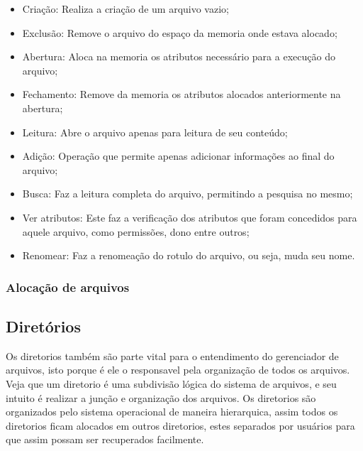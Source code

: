 \documentclass{article}
\begin{document}
\begin{itemize}

\item Criação: Realiza a criação de um arquivo vazio;
\item Exclusão: Remove o arquivo do espaço da memoria onde estava alocado;
\item Abertura: Aloca na memoria os atributos necessário para a execução do arquivo;
\item Fechamento: Remove da memoria os atributos alocados anteriormente na abertura;
\item Leitura: Abre o arquivo apenas para leitura de seu conteúdo;
\item Adição: Operação que permite apenas adicionar informações ao final do arquivo;
\item Busca: Faz a leitura completa do arquivo, permitindo a pesquisa no mesmo;
\item Ver atributos: Este faz a verificação dos atributos que foram concedidos para aquele arquivo, como permissões, dono entre outros;
\item Renomear: Faz a renomeação do rotulo do arquivo, ou seja, muda seu nome.

\end{itemize}

\subsubsection{Alocação de arquivos}
 

\subsection{Diretórios}

Os diretorios também são parte vital para o entendimento do gerenciador de arquivos, isto porque é ele o responsavel pela organização de todos os arquivos. Veja que um diretorio é uma subdivisão lógica do sistema de arquivos, e seu intuito é  realizar a junção e organização dos arquivos.
Os diretorios são organizados pelo sistema operacional de maneira hierarquica, assim todos os diretorios ficam alocados em outros diretorios, estes separados por usuários para que assim possam ser recuperados facilmente.
\end{document}
